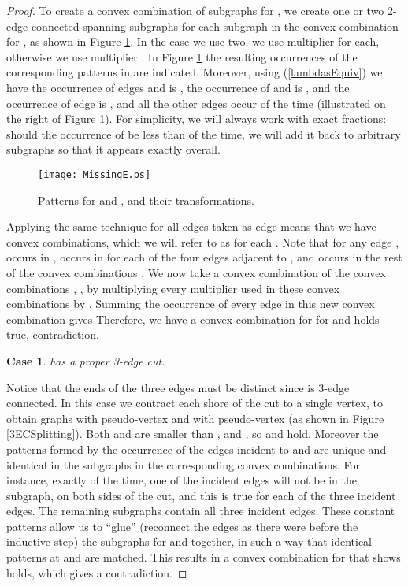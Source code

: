 \documentclass[oneeqnum,final]{siamltex1213}
\newtheorem{case}{Case}
\begin{document}
\begin{proof}
To create a convex combination of subgraphs for , we create one or two \mbox{2-edge} connected spanning subgraphs for each subgraph  in the convex combination for , as shown in Figure \ref{PatternsToMissingEdge}. In the case we use two, we use multiplier  for each, otherwise we use multiplier . In Figure \ref{PatternsToMissingEdge} the resulting occurrences of the corresponding patterns in  are indicated. Moreover, using (\ref{lambdasEquiv}) we have the occurrence of edges  and  is , the occurrence of  and  is , and the occurrence of edge  is , and all the other edges occur  of the time (illustrated on the right of Figure \ref{PatternsToMissingEdge}). For simplicity, we will always work with exact fractions: should the occurrence of  be less than  of the time, we will add it back to arbitrary subgraphs so that it appears exactly  overall.

\begin{figure}
\begin{center}
\texttt{[image: MissingE.ps]}
\end{center}
\caption{Patterns for  and , and their transformations.}
\label{PatternsToMissingEdge}
\end{figure}

Applying the same technique for all edges  taken as edge  means that we have  convex combinations, which we will refer to as  for each . Note that for any edge ,  occurs  in ,  occurs  in  for each of the four edges  adjacent to , and  occurs  in the rest of the convex combinations . We now take a convex combination of the  convex combinations , , by multiplying every multiplier  used in these convex combinations by . Summing the occurrence of every edge in this new convex combination gives Therefore, we have a convex combination for  for  and  holds true, contradiction.

\begin{case} \label{caseTwo}
 has a proper 3-edge cut.
\end{case}
Notice that the ends of the three edges must be distinct since  is 3-edge connected. In this case we contract each shore of the cut to a single vertex, to obtain graphs  with pseudo-vertex  and  with pseudo-vertex  (as shown in Figure\,\ref{3ECSplitting}). Both  and  are smaller than ,  and , so  and  hold. Moreover the patterns formed by the occurrence of the edges incident to  and  are unique and identical in the subgraphs in the corresponding convex combinations. For instance, exactly  of the time, one of the incident edges will not be in the subgraph, on both sides of the cut, and this is true for each of the three incident edges. The remaining subgraphs contain all three incident edges. These constant patterns allow us to ``glue'' (reconnect the edges as there were before the inductive step) the subgraphs for  and  together, in such a way that identical patterns at  and  are matched. This results in a convex combination for  that shows  holds, which gives a contradiction.
\end{proof}
\end{document}
